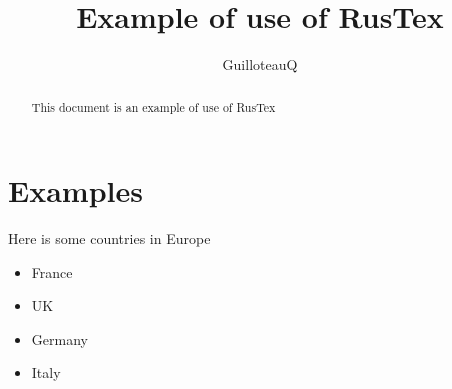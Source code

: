 \documentclass[a4paper,11pt]{article}
\title{Example of use of RusTex}
\author{GuilloteauQ}
\begin{document}
\maketitle
\begin{abstract}
This document is an example of use of RusTex
\end{abstract}
\section{Examples}
Here is some countries in Europe\begin{itemize}
\item France
\item UK
\item Germany
\item Italy

\end{itemize}
\end{document}
